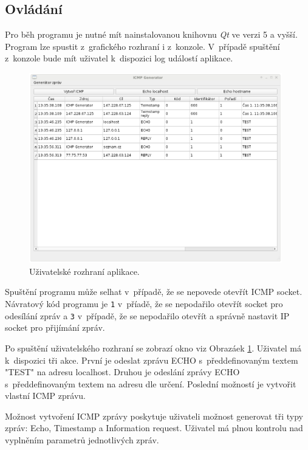 \documentclass[12pt, a4paper]{article}
\begin{document}
\subsection{Ovládání}

Pro běh programu je nutné mít nainstalovanou knihovnu \emph{Qt} ve verzi 5 a vyšší. Program lze spustit z~grafického rozhraní i z~konzole. V~případě spuštění z~konzole bude mít uživatel k~dispozici log událostí aplikace.

\begin{figure}[h!]
\centering
\includegraphics[width=110mm]{gui.png}
\caption{Uživatelské rozhraní aplikace.}
\label{gui}
\end{figure}

Spuštění programu může selhat v~případě, že se nepovede otevřít ICMP socket. Návratový kód programu je \texttt{1} v~příadě, že se nepodařilo otevřít socket pro odesílání zpráv a \texttt{3} v~případě, že se nepodařilo otevřít a správně nastavit IP socket pro přijímání zpráv.

Po spuštění uživatelského rozhraní se zobrazí okno viz Obrazáek \ref{gui}. Uživatel má k~dispozici tři akce. První je odeslat zprávu ECHO s~předdefinovaným textem "TEST" na adresu localhost. Druhou je odeslání zprávy ECHO s~předdefinovaným textem na adresu dle určení. Poslední možností je vytvořit vlastní ICMP zprávu.

Možnost vytvoření ICMP zprávy poskytuje uživateli možnost generovat tři typy zpráv: Echo, Timestamp a Information request. Uživatel má plnou kontrolu nad vyplněním parametrů jednotlivých zpráv.
\end{document}
